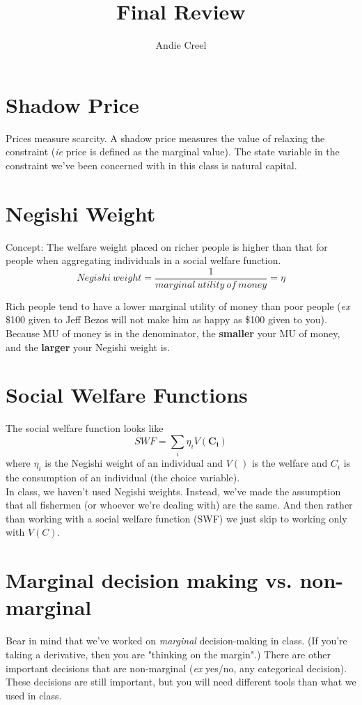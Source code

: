 \documentclass[12pt]{article}
\title{Final Review}
\author{Andie Creel}
\begin{document}
\maketitle

\section{Shadow Price}
Prices measure scarcity. A shadow price measures the value of relaxing the constraint (\textit{ie} price is defined as the marginal value). The state variable in the constraint we've been concerned with in this class is natural capital. 

\section{Negishi Weight}
Concept: The welfare weight placed on richer people is higher than that for people when aggregating individuals in a social welfare function. 
\begin{equation}
    Negishi \ weight = \frac{1}{marginal \ utility \ of \ money} = \eta
\end{equation}

Rich people tend to have a lower marginal utility of money than poor people (\textit{ex} \$100 given to Jeff Bezos will not make him as happy as \$100 given to you). Because MU of money is in the denominator, the \textbf{smaller} your MU of money, and the \textbf{larger} your Negishi weight is. \\

\section{Social Welfare Functions}
The social welfare function looks like 
\begin{equation}
    SWF = \sum_i \eta_i V(\mathbf{C_i})
\end{equation}
where $\eta_i$ is the Negishi weight of an individual and $V()$ is the welfare and $C_i$ is the consumption of an individual (the choice variable). \\

In class, we haven't used Negishi weights. Instead, we've made the assumption that all fishermen (or whoever we're dealing with) are the same. And then rather than working with a social welfare function (SWF) we just skip to working only with $V(C)$. 

\section{Marginal decision making vs. non-marginal}
Bear in mind that we've worked on \textit{marginal} decision-making in class. (If you're taking a derivative, then you are "thinking on the margin".) There are other important decisions that are non-marginal (\textit{ex} yes/no, any categorical decision). These decisions are still important, but you will need different tools than what we used in class. \\
\end{document}
